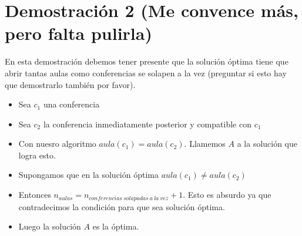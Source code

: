 \documentclass{article}
\begin{document}
	\section{Demostración 2 (Me convence más, pero falta pulirla)}
	En esta demostración debemos tener presente que la solución óptima tiene que abrir tantas aulas como conferencias se solapen a la vez (preguntar si esto hay que demostrarlo también por favor).
	\begin{itemize}
		
		\item Sea $c_1$ una conferencia
		\item Sea $c_2$ la conferencia inmediatamente posterior y compatible con $c_1$
		\item Con nuesro algoritmo $aula(c_1)=aula(c_2)$. Llamemos $A$ a la solución que logra esto.
		\item Supongamos que en la solución óptima $aula(c_1) \neq aula(c_2)$
		\item Entonces $n_{aulas}=n_{conferencias\ solapadas\ a\ la\ vez}+1$. Esto es absurdo ya que contradecimos la condición para que sea solución óptima.
		\item Luego la solución $A$ es la óptima.
	\end{itemize}
	
	
\end{document}
